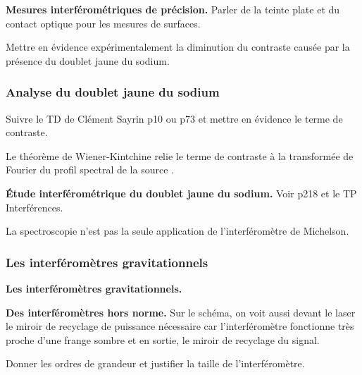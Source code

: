 \begin{slide}
\textbf{Mesures interférométriques de précision.}
Parler de la teinte plate et du contact optique pour les mesures de surfaces.
\end{slide}

\begin{transition}
Mettre en évidence expérimentalement la diminution du contraste causée par la présence du doublet jaune du sodium.
\end{transition}

\subsubsection{Analyse du doublet jaune du sodium}

Suivre le TD de Clément Sayrin p10 ou \cite{Olivier2000} p73 et mettre en évidence le terme de contraste.

\begin{remarque}
Le théorème de Wiener-Kintchine relie le terme de contraste à la transformée de Fourier du profil spectral de la source \cite{Perez2017}.
\end{remarque}

\begin{experience}
\textbf{Étude interférométrique du doublet jaune du sodium.}
Voir \cite{Fruchart2016} p218 et le TP Interférences.
\end{experience}

\begin{transition}
La spectroscopie n'est pas la seule application de l'interféromètre de Michelson.
\end{transition}

\subsubsection{Les interféromètres gravitationnels}

\begin{slide}
\textbf{Les interféromètres gravitationnels.}
\end{slide}

\begin{slide}
\textbf{Des interféromètres hors norme.}
Sur le schéma, on voit aussi devant le laser le miroir de recyclage de puissance nécessaire car l'interféromètre fonctionne très proche d'une frange sombre et en sortie, le miroir de recyclage du signal.
\end{slide}

Donner les ordres de grandeur et justifier la taille de l'interféromètre.

